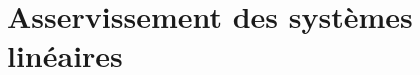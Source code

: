 \chapter[Asservissement Linéaire]{Asservissement des systèmes 
linéaires\label{chap-asservis}}
\minitoc
\newpage

\captionsetup{width=0.9\linewidth}

